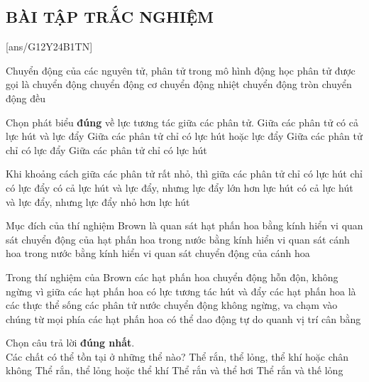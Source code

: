 \subsection{BÀI TẬP TRẮC NGHIỆM}
[ans/G12Y24B1TN]
\begin{ex}
Chuyển động của các nguyên tử, phân tử trong mô hình động học phân tử được gọi là chuyển động
\choice
{chuyển động cơ}
{\True chuyển động nhiệt}
{chuyển động tròn}
{chuyển động đều}
\end{ex}

\begin{ex}

Chọn phát biểu \textbf{đúng} về lực tương tác giữa các phân tử.
\choice
{\True Giữa các phân tử có cả lực hút và lực đẩy}
{ Giữa các phân tử chỉ có lực hút hoặc lực đẩy}
{ Giữa các phân tử chỉ có lực đẩy}
{ Giữa các phân tử chỉ có lực hút}
\end{ex}

\begin{ex}
Khi khoảng cách giữa các phân tử rất nhỏ, thì giữa các phân tử
\choice
{ chỉ có lực hút}
{ chỉ có lực đẩy}
{\True có cả lực hút và lực đẩy, nhưng lực đẩy lớn hơn lực hút}
{ có cả lực hút và lực đẩy, nhưng lực đẩy nhỏ hơn lực hút}
\end{ex}


\begin{ex}
Mục đích của thí nghiệm Brown là
\choice
{ quan sát hạt phấn hoa bằng kính hiển vi}
{\True quan sát chuyển động của hạt phấn hoa trong nước bằng kính hiển vi}
{ quan sát cánh hoa trong nước bằng kính hiển vi}
{ quan sát chuyển động của cánh hoa}
\end{ex}


\begin{ex} 
Trong thí nghiệm của Brown các hạt phấn hoa chuyển động hỗn độn, không ngừng vì
\choice
{ giữa các hạt phấn hoa có lực tương tác hút và đẩy}
{ các hạt phấn hoa là các thực thể sống}
{\True các phân tử nước chuyển động không ngừng, va chạm vào chúng từ mọi phía}
{ các hạt phấn hoa có thể dao động tự do quanh vị trí cân bằng}
\end{ex}


\begin{ex}
Chọn câu trả lời \textbf{đúng nhất}. \\
Các chất có thể tồn tại ở những thể nào?
\choice
{ Thể rắn, thể lỏng, thể khí hoặc chân không}
{\True Thể rắn, thể lỏng hoặc thể khí}
{ Thể rắn và thể hơi}
{ Thể rắn và thế lỏng}
\end{ex}



